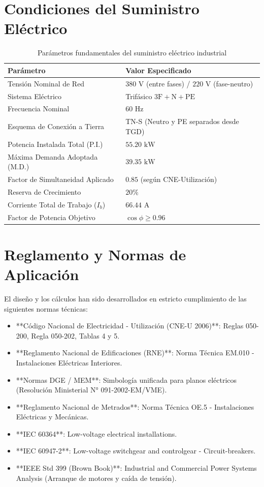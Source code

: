 \section{Condiciones del Suministro Eléctrico}
\begin{table}[H]
\centering
\caption{Parámetros fundamentales del suministro eléctrico industrial}
\begin{tabular}{ll}
\toprule
\textbf{Parámetro} & \textbf{Valor Especificado} \\
\midrule
Tensión Nominal de Red & $380\text{ V}$ (entre fases) / $220\text{ V}$ (fase-neutro) \\
Sistema Eléctrico & Trifásico $3\text{F} + \text{N} + \text{PE}$ \\
Frecuencia Nominal & $60\text{ Hz}$ \\
Esquema de Conexión a Tierra & TN-S (Neutro y PE separados desde TGD) \\
Potencia Instalada Total (P.I.) & $55.20\text{ kW}$ \\
Máxima Demanda Adoptada (M.D.) & $39.35\text{ kW}$ \\
Factor de Simultaneidad Aplicado & $0.85$ (según CNE-Utilización) \\
Reserva de Crecimiento & $20\%$ \\
Corriente Total de Trabajo ($I_b$) & $66.44\text{ A}$ \\
Factor de Potencia Objetivo & $\cos\phi \ge 0.96$ \\
\bottomrule
\end{tabular}
\end{table}

\section{Reglamento y Normas de Aplicación}
El diseño y los cálculos han sido desarrollados en estricto cumplimiento de las siguientes normas técnicas:
\begin{itemize}
    \item **Código Nacional de Electricidad - Utilización (CNE-U 2006)**: Reglas 050-200, Regla 050-202, Tablas 4 y 5.
    \item **Reglamento Nacional de Edificaciones (RNE)**: Norma Técnica EM.010 - Instalaciones Eléctricas Interiores.
    \item **Normas DGE / MEM**: Simbología unificada para planos eléctricos (Resolución Ministerial N° 091-2002-EM/VME).
    \item **Reglamento Nacional de Metrados**: Norma Técnica OE.5 - Instalaciones Eléctricas y Mecánicas.
    \item **IEC 60364**: Low-voltage electrical installations.
    \item **IEC 60947-2**: Low-voltage switchgear and controlgear - Circuit-breakers.
    \item **IEEE Std 399 (Brown Book)**: Industrial and Commercial Power Systems Analysis (Arranque de motores y caída de tensión).
\end{itemize}
